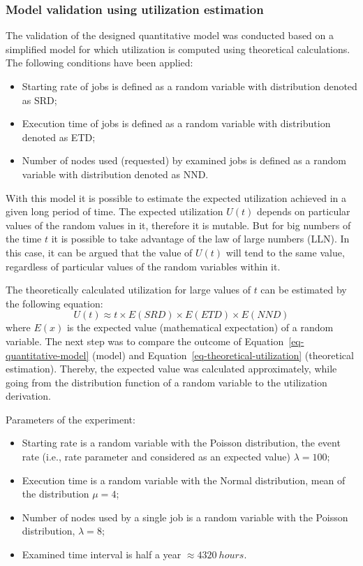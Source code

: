 \subsubsection{Model validation using utilization estimation} \label{sec-strategy-4-1}

The validation of the designed quantitative model was conducted based on a simplified model for which utilization is computed using theoretical calculations. The following conditions have been applied:
\begin{itemize}
	\item Starting rate of jobs is defined as a random variable with distribution denoted as SRD;
	\item Execution time of jobs is defined as a random variable with distribution denoted as ETD;
	\item Number of nodes used (requested) by examined jobs is defined as a random variable with distribution denoted as NND.
\end{itemize}

With this model it is possible to estimate the expected utilization achieved in a given long period of time. The expected utilization $U(t)$ depends on particular values of the random values in it, therefore it is mutable. But for big numbers of the time $t$ it is possible to take advantage of the law of large numbers (LLN). In this case, it can be argued that the value of $U(t)$ will tend to the same value, regardless of particular values of the random variables within it.

The theoretically calculated utilization for large values of $t$ can be estimated by the following equation:
\begin{equation}
	\label{eq-theoretical-utilization}
	U(t) \approx t \times E(SRD) \times E(ETD) \times E(NND)
\end{equation}
where $E(x)$ is the expected value (mathematical expectation) of a random variable. The next step was to compare the outcome of Equation~\ref{eq-quantitative-model} (model) and Equation~\ref{eq-theoretical-utilization} (theoretical estimation). Thereby, the expected value was calculated approximately, while going from the distribution function of a random variable to the utilization derivation.

Parameters of the experiment:
\begin{itemize}
	\item Starting rate is a random variable with the Poisson distribution, the event rate (i.e., rate parameter and considered as an expected value) $\lambda = 100$;
	\item Execution time is a random variable with the Normal distribution, mean of the distribution $\mu = 4$;
	\item Number of nodes used by a single job is a random variable with the Poisson distribution, $\lambda = 8$;
	\item Examined time interval is half a year $\approx4320\ hours$.
\end{itemize}

